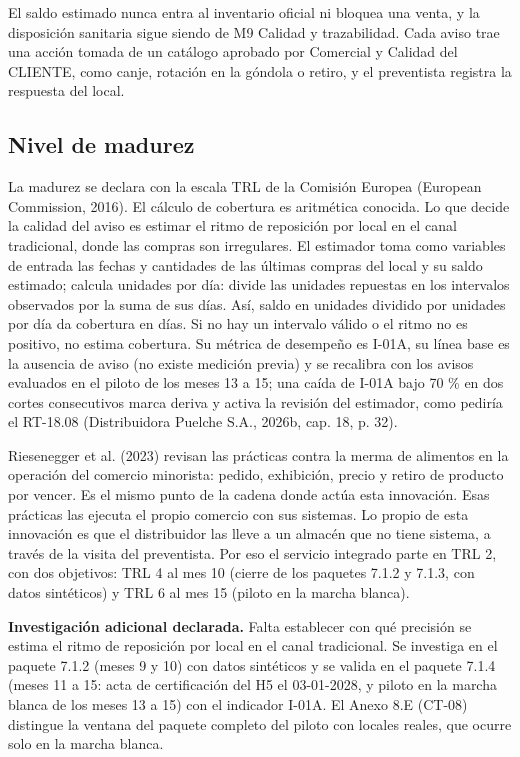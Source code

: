 El saldo estimado nunca entra al inventario oficial ni bloquea una venta, y la disposición sanitaria sigue siendo de M9 Calidad y trazabilidad. Cada aviso trae una acción tomada de un catálogo aprobado por Comercial y Calidad del CLIENTE, como canje, rotación en la góndola o retiro, y el preventista registra la respuesta del local.

\subsection{Nivel de madurez}

La madurez se declara con la escala TRL de la Comisión Europea (European Commission, 2016). El cálculo de cobertura es aritmética conocida. Lo que decide la calidad del aviso es estimar el ritmo de reposición por local en el canal tradicional, donde las compras son irregulares. El estimador toma como variables de entrada las fechas y cantidades de las últimas compras del local y su saldo estimado; calcula unidades por día: divide las unidades repuestas en los intervalos observados por la suma de sus días. Así, saldo en unidades dividido por unidades por día da cobertura en días. Si no hay un intervalo válido o el ritmo no es positivo, no estima cobertura. Su métrica de desempeño es I-01A, su línea base es la ausencia de aviso (no existe medición previa) y se recalibra con los avisos evaluados en el piloto de los meses 13 a 15; una caída de I-01A bajo 70 \% en dos cortes consecutivos marca deriva y activa la revisión del estimador, como pediría el RT-18.08 (Distribuidora Puelche S.A., 2026b, cap. 18, p. 32).

Riesenegger et al. (2023) revisan las prácticas contra la merma de alimentos en la operación del comercio minorista: pedido, exhibición, precio y retiro de producto por vencer. Es el mismo punto de la cadena donde actúa esta innovación. Esas prácticas las ejecuta el propio comercio con sus sistemas. Lo propio de esta innovación es que el distribuidor las lleve a un almacén que no tiene sistema, a través de la visita del preventista. Por eso el servicio integrado parte en TRL 2, con dos objetivos: TRL 4 al mes 10 (cierre de los paquetes 7.1.2 y 7.1.3, con datos sintéticos) y TRL 6 al mes 15 (piloto en la marcha blanca).

\textbf{Investigación adicional declarada.} Falta establecer con qué precisión se estima el ritmo de reposición por local en el canal tradicional. Se investiga en el paquete 7.1.2 (meses 9 y 10) con datos sintéticos y se valida en el paquete 7.1.4 (meses 11 a 15: acta de certificación del H5 el 03-01-2028, y piloto en la marcha blanca de los meses 13 a 15) con el indicador I-01A. El Anexo 8.E (CT-08) distingue la ventana del paquete completo del piloto con locales reales, que ocurre solo en la marcha blanca.

